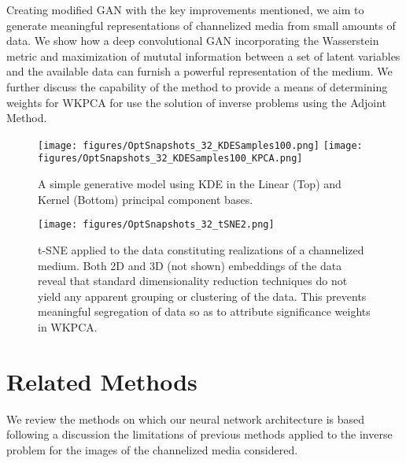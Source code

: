 \documentclass{article}
\begin{document}
	Creating modified GAN with the key improvements mentioned, we aim to generate meaningful representations of channelized media from small amounts of data.  We show how a deep convolutional GAN incorporating the Wasserstein metric and maximization of mututal information between a set of latent variables and the available data can furnish a powerful representation of the medium.  We further discuss the capability of the method to provide a means of determining weights for WKPCA for use the solution of inverse problems using the Adjoint Method.

\begin{figure}[t!]
  \texttt{[image: figures/OptSnapshots\_32\_KDESamples100.png]}
  \texttt{[image: figures/OptSnapshots\_32\_KDESamples100\_KPCA.png]}
  \caption{A simple generative model using KDE in the Linear (Top) and Kernel (Bottom) principal component bases. }
\end{figure}\label{KDEPCA}


\begin{figure}[h]
\texttt{[image: figures/OptSnapshots\_32\_tSNE2.png]}
  \caption{t-SNE applied to the data constituting realizations of a channelized medium.  Both 2D and 3D (not shown) embeddings of the data reveal that standard dimensionality reduction techniques do not yield any apparent grouping or clustering of the data.  This prevents meaningful segregation of data so as to attribute significance weights in WKPCA. }
\end{figure}\label{tSNE}

\section{Related Methods}\label{related}
	We review the methods on which our neural network architecture is based following a discussion the limitations of previous methods applied to the inverse problem for the images of the channelized media considered.
\newline
\end{document}
